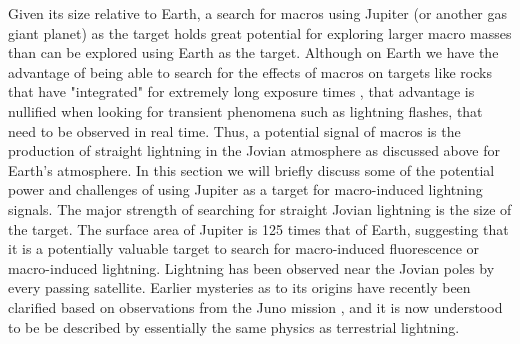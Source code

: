 \documentclass[%
 reprint,
 amsmath,amssymb,
 aps,
]{revtex4-2}
\newcommand{\vtwo}[1]{{\color{red} #1}}
\begin{document}
    Given its size relative to Earth, a search for macros using Jupiter (or another gas giant planet) as the target holds great potential for exploring larger macro masses than can be explored using Earth as the target. \vtwo{Although on Earth we have the advantage of being able to search for the effects of macros on targets like rocks that have "integrated" for extremely long exposure times \vtwo{\citep{Sidhu2019granite}}, that advantage is nullified when looking for transient phenomena such as lightning flashes, that need to be observed in real time. Thus, a potential signal of macros is the production of straight lightning in the Jovian atmosphere as discussed above for Earth's atmosphere. In this section we will briefly discuss some of the potential power and challenges of using Jupiter as a target for macro-induced lightning signals. The major strength of searching for straight Jovian lightning is the size of the target. The surface area of Jupiter is 125 times that of Earth, suggesting that it is a potentially valuable target to search for macro-induced fluorescence or macro-induced lightning. Lightning has been observed near the Jovian poles by every passing satellite. Earlier mysteries as to its origins have recently been clarified based on observations from the Juno mission \vtwo{\citep{Brown2018}}, and it is now understood to be be described by essentially the same physics as terrestrial lightning.}
\end{document}
